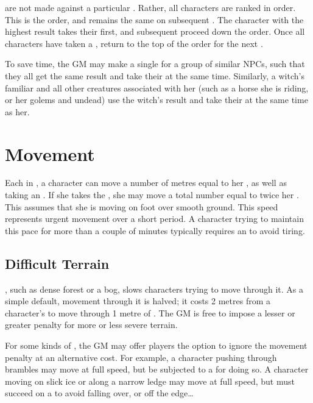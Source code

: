 \capital{\initiative} {\tests} are not made against a particular {\tn}.
Rather, all characters are ranked in order.
This is the {\initiative} order, and remains the same on subsequent {\rounds}.
The character with the highest result takes their {\turn} first, and subsequent {\turns} proceed down the {\initiative} order.
Once all characters have taken a {\turn}, return to the top of the {\initiative} order for the next {\round}.

To save time, the GM may make a single {\test} for a group of similar NPCs, such that they all get the same result and take their {\turns} at the same time.
Similarly, a witch's familiar and all other creatures associated with her (such as a horse she is riding, or her golems and undead) use the witch's {\initiative} result and take their {\turns} at the same time as her.

\section{Movement}

Each {\turn} in {\structuredtime}, a character can move a number of metres equal to her , as well as taking an {\action}.
If she takes the  {\action}, she may move a total number equal to twice her .
This assumes that she is moving on foot over smooth ground.
This speed represents urgent movement over a short period.
A character trying to maintain this pace for more than a couple of minutes typically requires an  {\test} to avoid tiring.



\subsection{Difficult Terrain}

\capital{\difficultterrain}, such as dense forest or a bog, slows characters trying to move through it.
As a simple default, movement through it is halved; it costs 2 metres from a character's  to move through 1 metre of {\difficultterrain}.
The GM is free to impose a lesser or greater penalty for more or less severe terrain.

For some kinds of {\difficultterrain}, the GM may offer players the option to ignore the movement penalty at an alternative cost.
For example, a character pushing through brambles may move at full speed, but be subjected to a {\damagetest} for doing so.
A character moving on slick ice or along a narrow ledge may move at full speed, but must succeed on a  {\test} to avoid falling over, or off the edge{\dots}


